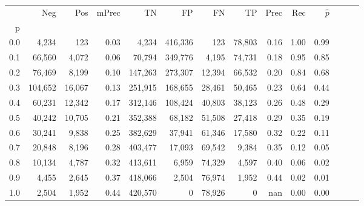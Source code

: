 \begin{tabular}{rrrrrrrrrrrrrr}
\toprule
{} &      Neg &     Pos & mPrec &       TN &       FP &      FN &      TP &  Prec &   Rec & $\hat{p}$ \\
p   &          &         &       &          &          &         &         &       &       &           \\
\midrule
0.0 &    4,234 &     123 &  0.03 &    4,234 &  416,336 &     123 &  78,803 &  0.16 &  1.00 &      0.99 \\
0.1 &   66,560 &   4,072 &  0.06 &   70,794 &  349,776 &   4,195 &  74,731 &  0.18 &  0.95 &      0.85 \\
0.2 &   76,469 &   8,199 &  0.10 &  147,263 &  273,307 &  12,394 &  66,532 &  0.20 &  0.84 &      0.68 \\
0.3 &  104,652 &  16,067 &  0.13 &  251,915 &  168,655 &  28,461 &  50,465 &  0.23 &  0.64 &      0.44 \\
0.4 &   60,231 &  12,342 &  0.17 &  312,146 &  108,424 &  40,803 &  38,123 &  0.26 &  0.48 &      0.29 \\
0.5 &   40,242 &  10,705 &  0.21 &  352,388 &   68,182 &  51,508 &  27,418 &  0.29 &  0.35 &      0.19 \\
0.6 &   30,241 &   9,838 &  0.25 &  382,629 &   37,941 &  61,346 &  17,580 &  0.32 &  0.22 &      0.11 \\
0.7 &   20,848 &   8,196 &  0.28 &  403,477 &   17,093 &  69,542 &   9,384 &  0.35 &  0.12 &      0.05 \\
0.8 &   10,134 &   4,787 &  0.32 &  413,611 &    6,959 &  74,329 &   4,597 &  0.40 &  0.06 &      0.02 \\
0.9 &    4,455 &   2,645 &  0.37 &  418,066 &    2,504 &  76,974 &   1,952 &  0.44 &  0.02 &      0.01 \\
1.0 &    2,504 &   1,952 &  0.44 &  420,570 &        0 &  78,926 &       0 &   nan &  0.00 &      0.00 \\
\bottomrule
\end{tabular}
